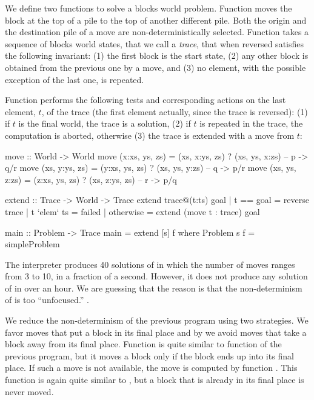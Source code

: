%
We define two functions to solve a blocks world problem.
Function  moves the block at the top of a pile to
the top of another different pile.  Both the origin and the destination pile
of a move are non-deterministically selected.
Function  takes a sequence of blocks world states,
that we call a \emph{trace}, that when reversed satisfies the
following invariant: (1) the first block is the start state,
(2) any other block is obtained from the previous one by a move,
and (3) no element, with the possible exception of the last one,
is repeated.

Function  performs the following tests and corresponding
actions on the last element, $t$, of the trace (the first element actually,
since the trace is reversed):
(1) if $t$ is the final world, the trace is a solution,
(2) if $t$ is repeated in the trace, the computation is aborted,
otherwise (3) the trace is extended with a move from $t$:
%
\begin{curry}
move :: World -> World
move (x:xs, ys, zs) = (xs, x:ys, zs) ? (xs, ys, x:zs) -- p -> q/r
move (xs, y:ys, zs) = (y:xs, ys, zs) ? (xs, ys, y:zs) -- q -> p/r
move (xs, ys, z:zs) = (z:xs, ys, zs) ? (xs, z:ys, zs) -- r -> p/q

extend :: Trace -> World -> Trace
extend trace@(t:ts) goal
  | t == goal    = reverse trace
  | t `elem` ts  = failed
  | otherwise    = extend (move t : trace) goal

main :: Problem -> Trace
main = extend [s] f where Problem s f = simpleProblem
\end{curry}
%
The \pakcs{} interpreter produces 40 solutions of 
in which the number of moves ranges from 3 to 10, in a fraction of a second.
However, it does not produce any solution of  in
over an hour.  We are guessing that the reason is that the
non-determinism of  is too ``unfocused.''
.

We reduce the non-determinism of the previous program using
two strategies.  We favor moves that put a block in its final place and
by we avoid moves that take a block away from its final place.
Function  is quite similar to function 
of the previous program, but it moves a block only
if the block ends up into its final place.  If such a move is not available,
the move is computed by function .
This function is again quite similar to ,
but a block that is already in its final place is never moved.

